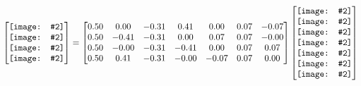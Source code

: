 \documentclass[preview, border={0pt 10pt 0pt 0pt}]{standalone}
\def\xpic#1#2{\texttt{[image: \#2]}}
\def\xpicbig#1#2{\texttt{[image: \#2]}}
\def\pic#1#2{{%
      \mathchoice
        {\xpic{#1}{#2}}%
        {\xpic{#1}{#2}}%
        {\xpic{\defaultscriptratio}{#2}}%
        {\xpic{\defaultscriptscriptratio}{#2}}}}
\def\picbig#1#2{{%
      \mathchoice
        {\xpicbig{#1}{#2}}%
        {\xpicbig{#1}{#2}}%
        {\xpicbig{\defaultscriptratio}{#2}}%
        {\xpicbig{\defaultscriptscriptratio}{#2}}}}
\begin{document}
    \begin{align*}
      \begin{bmatrix}
         \picbig{2.0}{sch0}\\\picbig{2.0}{sch1}\\\picbig{2.0}{sch2}\\\picbig{2.0}{sch3}\\
      \end{bmatrix} =
      \begin{bmatrix}
         0.50 & 0.00 & -0.31 & 0.41 & 0.00 & 0.07 & -0.07 \\0.50 & -0.41 & -0.31 & 0.00 & 0.07 & 0.07 & -0.00 \\0.50 & -0.00 & -0.31 & -0.41 & 0.00 & 0.07 & 0.07 \\0.50 & 0.41 & -0.31 & -0.00 & -0.07 & 0.07 & 0.00 \\
      \end{bmatrix}
      \begin{bmatrix}
        \pic{1.0}{sph0}\\\pic{1.0}{sph1}\\\pic{1.0}{sph2}\\\pic{1.0}{sph3}\\\pic{1.0}{sph4}\\\pic{1.0}{sph5}\\\pic{1.0}{sph6}\\   
      \end{bmatrix}
    \end{align*}
    
\end{document}

